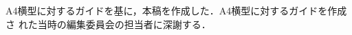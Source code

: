 \begin{acknowledgment}
A4横型に対するガイドを基に，本稿を作成した．A4横型に対するガイドを作成さ
れた当時の編集委員会の担当者に深謝する．
\end{acknowledgment}